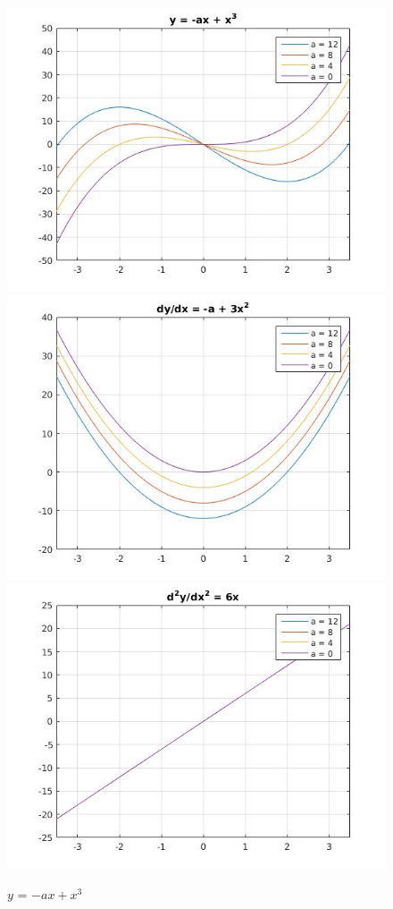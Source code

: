\documentclass{article}
\begin{document}
\begin{figure}[!h]
    \centering
    \includegraphics[scale = 0.40]{13.jpg}
    \includegraphics[scale = 0.40]{14.jpg}
    \includegraphics[scale = 0.5]{15.jpg}
    \caption{$y$ = $-ax + x^{3}$}
    \label{fig:y = -ax + x^{3}}
\end{figure}
\newpage
\end{document}
